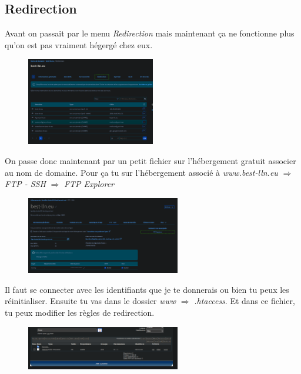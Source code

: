 \documentclass[12pt]{article}
\begin{document}
	\subsection{Redirection}
		Avant on passait par le menu \textit{Redirection} mais maintenant ça ne fonctionne plus qu'on est pas vraiment hégergé chez eux.
		\begin{figure}[htp]
			\centering
			\includegraphics[width=0.5\textwidth]{img/OVH-Redirect.png}
		\end{figure}
\newpage
		On passe donc maintenant par un petit fichier sur l'hébergement gratuit associer au nom de domaine. Pour ça tu sur l'hébergement associé à \textit{www.best-lln.eu} $\Rightarrow$ \textit{FTP - SSH} $\Rightarrow$ \textit{FTP Explorer}
		\begin{figure}[htp]
			\centering
			\includegraphics[width=0.6\textwidth]{img/FTP-Explorer.png}
		\end{figure}

		Il faut se connecter avec les identifiants que je te donnerais ou bien tu peux les réinitialiser. Ensuite tu vas dans le dossier \textit{www} $\Rightarrow$ \textit{.htaccess}. Et dans ce fichier, tu peux modifier les règles de redirection.
		\begin{figure}[htp]
			\centering
			\includegraphics[width=0.6\textwidth]{img/htaccess.png}
		\end{figure}
		
\end{document}
